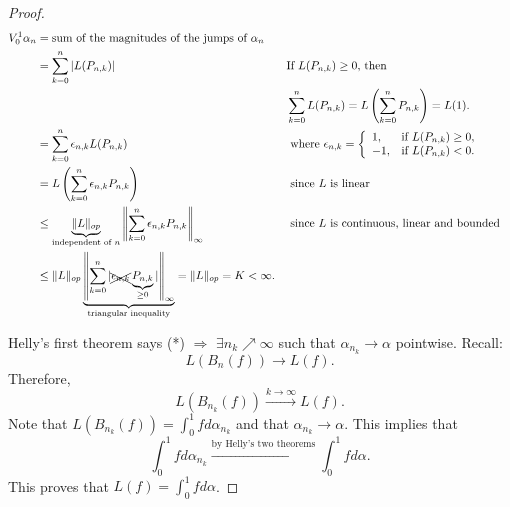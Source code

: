 \documentclass[letterpaper, reqno,11pt]{article}
\begin{document}
\begin{proof}
  \begin{align*}
    V_0^1 \alpha_n &= \text{sum of the magnitudes of the jumps of $\alpha_n$} \\
    &= \sum_{k = 0}^n |L(P_{n, k})| && \text{If $L(P_{n, k}) \geq 0$, then} \\
    & && \sum_{k = 0}^n L(P_{n, k}) = L\left(\sum_{k = 0}^n P_{n, k}\right) = L(1). \\
    &= \sum_{k = 0}^n \epsilon_{n, k} L(P_{n, k}) && \text{ where $\epsilon_{n, k} = \left\{
      \begin{array}{ll}
        1, & \text{if $L(P_{n, k}) \geq 0$}, \\
        -1, & \text{if $L(P_{n, k}) < 0$}.
      \end{array}
      \right.$} \\
    &= L\left(\sum_{k = 0}^n \epsilon_{n, k} P_{n, k}\right) && \text{ since $L$ is linear} \\
    &\leq \underbrace{\lVert L \rVert_{op}}_\text{independent of $n$} \left\lVert \sum_{k = 0}^n \epsilon_{n, k} P_{n, k} \right\rVert_\infty && \text{ since $L$ is continuous, linear and bounded} \\
    &\leq \lVert L \rVert_{op} \underbrace{\left\lVert \sum_{k = 0}^n |\xcancel{\text{$\epsilon_{n, k}$}} \underbrace{P_{n, k}}_{\geq 0}| \right\rVert_\infty}_\text{triangular inequality} = \lVert L \rVert_{op} = K < \infty.
  \end{align*}

  Helly's first theorem says (*) $\Rightarrow$ $\exists n_k \nearrow \infty$ such that $\alpha_{n_k} \to \alpha$ pointwise. Recall:
  \[ L(B_n(f)) \to L(f). \]
  Therefore,
  \[ L(B_{n_k}(f)) \xrightarrow{k \to \infty} L(f). \]
  Note that $L(B_{n_k}(f)) = \int_0^1 fd\alpha_{n_k}$ and that $\alpha_{n_k} \to \alpha$. This implies that
  \[ \int_0^1 fd\alpha_{n_k} \xrightarrow{\text{by Helly's two theorems}} \int_0^1 fd\alpha. \]
  This proves that $L(f) = \int_0^1 fd\alpha$.
\end{proof}
\end{document}
